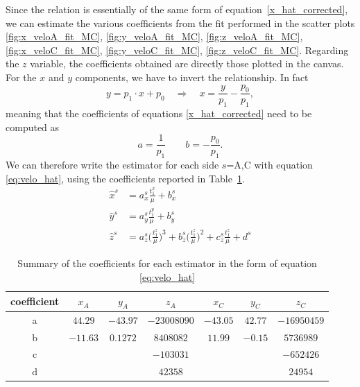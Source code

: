 Since the relation is essentially of the same form of equation~\eqref{x_hat_corrected}, we can estimate the various coefficients from the fit performed in the scatter plots \ref{fig:x_veloA_fit_MC}, \ref{fig:y_veloA_fit_MC}, \ref{fig:z_veloA_fit_MC}, \ref{fig:x_veloC_fit_MC}, \ref{fig:y_veloC_fit_MC}, \ref{fig:z_veloC_fit_MC}. Regarding the $z$ variable, the coefficients obtained are directly those plotted in the canvas. For the $x$ and $y$ components, we have to invert the relationship. In fact
\begin{equation}
    y = p_1\cdot x +p_0 \quad  \Longrightarrow \quad  x = \frac{y}{p_1}-\frac{p_0}{p_1},
\end{equation}
meaning that the coefficients of equations \eqref{x_hat_corrected} need to be computed as 
\begin{equation}
    a = \frac{1}{p_1} \qquad b = -\frac{p_0}{p_1}.
\end{equation}
We can therefore write the estimator for each side $s$=A,C with equation \eqref{eq:velo_hat}, using the coefficients reported in Table~\ref{tab:coefficients}.
\begin{equation}
\begin{split}
    \hat{x}^{s} &= a_x^s \frac{t^x_1}{\mu} + b_x^s\\%
    \hat{y}^{s} &=a_y^s \frac{t^y_1}{\mu} + b_y^s \\%
    \hat{z}^{s} &=a_z^s\biggl(\frac{t^z_1}{\mu}\biggr)^3 + b_z^s\biggl(\frac{t^z_1}{\mu}\biggr)^2 + c_z^s \frac{t^z_1}{\mu} + d^s
    \end{split} \label{eq:velo_hat}
    \end{equation}
    
\begin{table}
\centering
\begin{tabular}{c|c|c|c|c|c|c}
coefficient  & $x_A$   & $y_A$   & $z_A$      & $x_C$   & $y_C$  & $z_C$      \\\hline
a & $44.29$  & $-43.97$ &  $-23008090$    & $-43.05$ & $42.77$ &   $-16950459$   \\
b & $-11.63$ & $0.1272$ & $8408082$   & $11.99$  & $-0.15$ &  $5736989$ \\
c &        &        & $-103031$   &        &       &  $-652426 $  \\
d &        &        &  $42358$ &        &       & $24954$
\end{tabular}
\caption{Summary of the coefficients for each estimator in the form of equation \eqref{eq:velo_hat}}\label{tab:coefficients}
\end{table}

